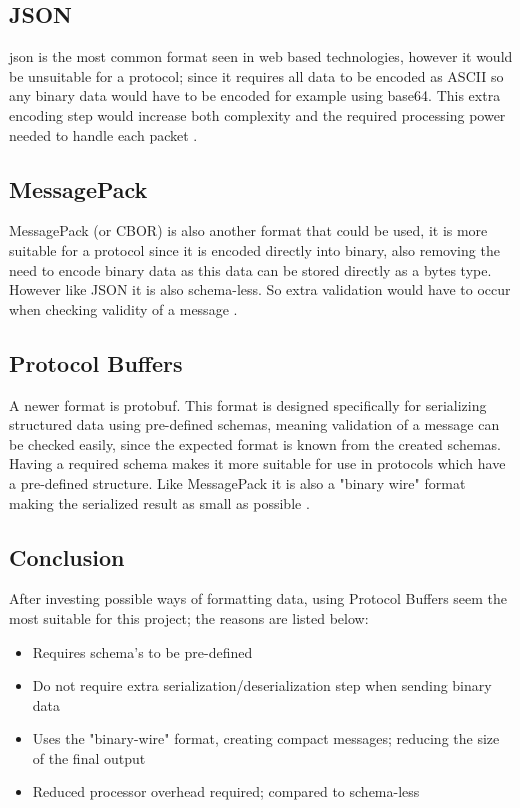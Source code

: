 \subsection*{JSON}
\acrfull{json} is the most common format seen in web based technologies, however it would be unsuitable for a protocol; since it requires all data to be encoded as ASCII so any binary data would have to be encoded for example using base64. This extra encoding step would increase both complexity and the required processing power needed to handle each packet \parencite{json-rfc8259}.

\subsection*{MessagePack}
MessagePack (or CBOR) is also another format that could be used, it is more suitable for a protocol since it is encoded directly into binary, also removing the need to encode binary data as this data can be stored directly as a bytes type. However like JSON it is also schema-less. So extra validation would have to occur when checking validity of a message \parencite{msgpack} \parencite{cbor-rfc8949}.

\subsection*{Protocol Buffers}
A newer format is protobuf. This format is designed specifically for serializing structured data using pre-defined schemas, meaning validation of a message can be checked easily, since the expected format is known from the created schemas. Having a required schema makes it more suitable for use in protocols which have a pre-defined structure. Like MessagePack it is also a "binary wire" format making the serialized result as small as possible \parencite{protobuf-3}.

\subsection*{Conclusion}
After investing possible ways of formatting data, using Protocol Buffers seem the most suitable for this project; the reasons are listed below:

\begin{itemize}
    \item Requires schema's to be pre-defined
    \item Do not require extra serialization/deserialization step when sending binary data
    \item Uses the "binary-wire" format, creating compact messages; reducing the size of the final output
    \item Reduced processor overhead required; compared to schema-less
\end{itemize}


